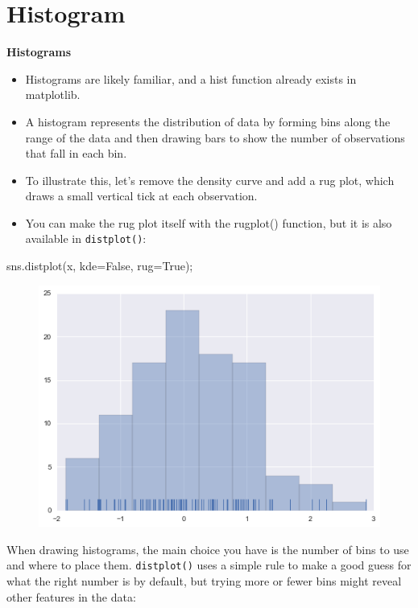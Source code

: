 \documentclass{beamer}
\begin{document}
\section{Histogram}
\begin{frame}[fragile]
	\large
\noindent \textbf{Histograms}
\begin{itemize}
\item Histograms are likely familiar, and a hist function already exists in matplotlib. 
\item A histogram represents the distribution of data by forming bins along the range of the data and then drawing bars to show the number of observations that fall in each bin.
\end{itemize}

\end{frame}
\begin{frame}[fragile]
	\large
\begin{itemize}
\item To illustrate this, let’s remove the density curve and add a rug plot, which draws a small vertical tick at each observation. 
\item You can make the rug plot itself with the rugplot() function, but it is also available in \texttt{distplot()}:
\end{itemize}


sns.distplot(x, kde=False, rug=True);
\begin{figure}
\centering
\includegraphics[width=0.7\linewidth]{images/distributions_10_0}
\end{figure}

\end{frame}
\begin{frame}[fragile]
When drawing histograms, the main choice you have is the number of bins to use and where to place them. \texttt{distplot()} uses a simple rule to make a good guess for what the right number is by default, but trying more or fewer bins might reveal other features in the data:

\end{frame}
\end{document}
